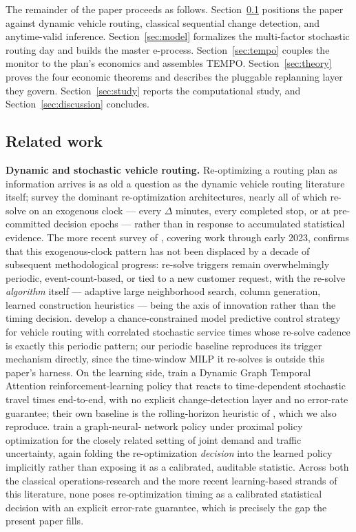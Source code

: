 \documentclass[trsc,dblanonrev]{informs4}
\begin{document}
The remainder of the paper proceeds as follows.
Section~\ref{sec:related} positions the paper against dynamic vehicle
routing, classical sequential change detection, and anytime-valid
inference. Section~\ref{sec:model} formalizes the multi-factor
stochastic routing day and builds the master e-process.
Section~\ref{sec:tempo} couples the monitor to the plan's economics and
assembles TEMPO. Section~\ref{sec:theory} proves the four economic
theorems and describes the pluggable replanning layer they govern.
Section~\ref{sec:study} reports the computational study, and
Section~\ref{sec:discussion} concludes.

\subsection{Related work}\label{sec:related}

\textbf{Dynamic and stochastic vehicle routing.} Re-optimizing a
routing plan as information arrives is as old a question as the
dynamic vehicle routing literature itself; \citet{pillac2013review}
survey the dominant re-optimization architectures, nearly all of which
re-solve on an exogenous clock --- every $\Delta$ minutes, every
completed stop, or at pre-committed decision epochs --- rather than in
response to accumulated statistical evidence. The more recent survey
of \citet{ouertani2024dvrp}, covering work through early 2023, confirms
that this exogenous-clock pattern has not been displaced by a decade
of subsequent methodological progress: re-solve triggers remain
overwhelmingly periodic, event-count-based, or tied to a new customer
request, with the re-solve \emph{algorithm} itself --- adaptive large
neighborhood search, column generation, learned construction
heuristics --- being the axis of innovation rather than the timing
decision. \citet{he2026smpc} develop a chance-constrained model
predictive control strategy for vehicle routing with correlated
stochastic service times whose re-solve cadence is exactly this
periodic pattern; our periodic baseline reproduces its trigger
mechanism directly, since the time-window MILP it re-solves is outside
this paper's harness. On the learning side, \citet{chen2025dgta} train
a Dynamic Graph Temporal Attention reinforcement-learning policy that
reacts to time-dependent stochastic travel times end-to-end, with no
explicit change-detection layer and no error-rate guarantee; their own
baseline is the rolling-horizon heuristic of \citet{gmira2021rollingopt},
which we also reproduce. \citet{kadyrov2025drl} train a graph-neural-
network policy under proximal policy optimization for the closely
related setting of joint demand and traffic uncertainty, again folding
the re-optimization \emph{decision} into the learned policy implicitly
rather than exposing it as a calibrated, auditable statistic. Across
both the classical operations-research and the more recent
learning-based strands of this literature, none poses re-optimization
timing as a calibrated statistical decision with an explicit
error-rate guarantee, which is precisely the gap the present paper
fills.
\end{document}

